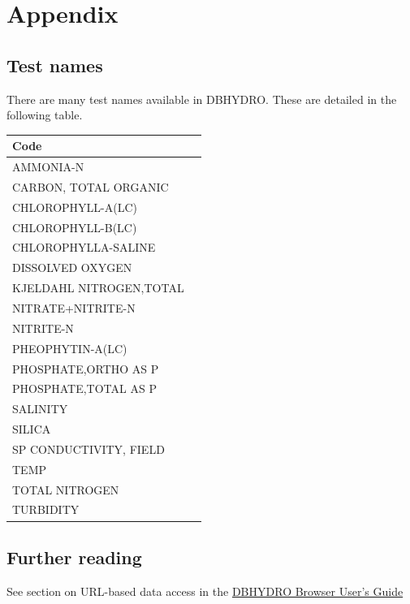 \documentclass[12pt,notitlepage]{article}
\begin{document}
\section{\label{sec:appendix}Appendix}
\subsection{Test names}
There are many test names available in DBHYDRO. These are detailed in the following table.\\

\begin{longtable}{| p{} | p{} |} 
\hline
Code\\
\hline
AMMONIA-N\\
CARBON, TOTAL ORGANIC\\
CHLOROPHYLL-A(LC)\\
CHLOROPHYLL-B(LC)\\
CHLOROPHYLLA-SALINE\\
DISSOLVED OXYGEN\\
KJELDAHL NITROGEN,TOTAL\\
NITRATE+NITRITE-N\\
NITRITE-N\\
PHEOPHYTIN-A(LC)\\
PHOSPHATE,ORTHO AS P\\
PHOSPHATE,TOTAL AS P\\
SALINITY\\
SILICA\\
SP CONDUCTIVITY, FIELD\\
TEMP\\
TOTAL NITROGEN\\
TURBIDITY\\
\hline
\end{longtable}

\subsection{Further reading}
See section on URL-based data access in the \href{http://www.sfwmd.gov/portal/page/portal/xrepository/sfwmd_repository_pdf/dbhydrobrowseruserdocumentation.pdf}{DBHYDRO Browser User's Guide}

\medskip
 


 
\end{document}
